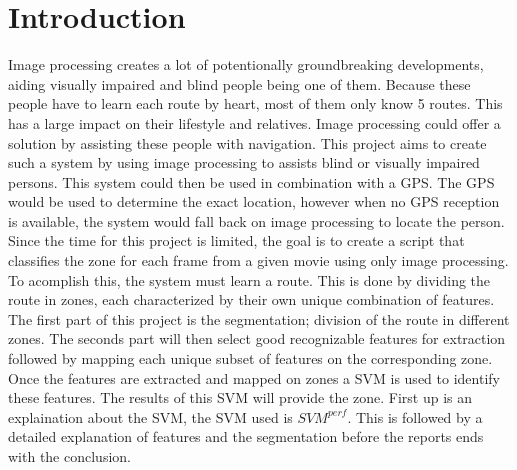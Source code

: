 \section{Introduction}
Image processing creates a lot of potentionally groundbreaking developments, aiding visually impaired and blind people being one of them. Because these people have to learn each route by heart, most of them only know 5 routes. This has a large impact on their lifestyle and relatives. Image processing could offer a solution by assisting these people with navigation.
\npar
This project aims to create such a system by using image processing to assists blind or visually impaired persons. This system could then be used in combination with a GPS. The GPS would be used to determine the exact location, however when no GPS reception is available, the system would fall back on image processing to locate the person. Since the time for this project is limited, the goal is to create a script that classifies the zone for each frame from a given movie using only image processing. 
\npar
To acomplish this, the system must learn a route. This is done by dividing the route in zones, each characterized by their own unique combination of features. The first part of this project is the segmentation; division of the route in different zones. The seconds part will then select good recognizable features for extraction followed by mapping each unique subset of features on the corresponding zone. Once the features are extracted and mapped on zones a SVM is used to identify these features. The results of this SVM will provide the zone.
\npar
First up is an explaination about the SVM, the SVM used is \(SVM^{perf}\).
This is followed by a detailed explanation of features and the segmentation before the reports ends with the conclusion.